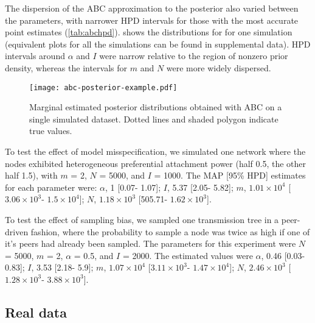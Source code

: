 \documentclass[12pt]{article}\usepackage[]{graphicx}\usepackage[]{color}
\begin{document}
The dispersion of the \gls{ABC} approximation to the posterior also varied
between the parameters, with narrower \gls{HPD} intervals for those with the
most accurate point estimates (\cref{tab:abchpd}).  shows the
distributions for for one simulation (equivalent plots for all the simulations
can be found in supplemental data). \Gls{HPD} intervals around $\alpha$ and $I$
were narrow relative to the region of nonzero prior density, whereas the
intervals for $m$ and $N$ were more widely dispersed.

\begin{figure}[ht]
  \centering
  \texttt{[image: abc-posterior-example.pdf]}
  \caption{Marginal estimated posterior distributions obtained with ABC on a
  single simulated dataset. Dotted lines and shaded polygon indicate true
  values.}
  \label{fig:abcex}
\end{figure}



To test the effect of model misspecification, we simulated one network where
the nodes exhibited heterogeneous preferential attachment power (half 0.5, the
other half 1.5), with $m$ = 2, $N$ = 5000, and $I$ = 1000. The \gls{MAP} [95\%
HPD] estimates for each parameter were: 
$\alpha$, 
  1 [0.07-
                           1.07];
$I$,
  5.37 [2.05-
                       5.82];
$m$,
  \ensuremath{1.01\times 10^{4}} [\ensuremath{3.06\times 10^{3}}-
                              \ensuremath{1.5\times 10^{4}}];
$N$,
  \ensuremath{1.18\times 10^{3}} [505.71-
                       \ensuremath{1.62\times 10^{3}}].



To test the effect of sampling bias, we sampled one transmission tree in a
peer-driven fashion, where the probability to sample a node was twice as high
if one of it's peers had already been sampled. The parameters for this
experiment were $N$ = 5000, $m$ = 2, $\alpha$ = 0.5, and $I$ = 2000. The
estimated values were
$\alpha$, 
  0.46 [0.03-
                           0.83];
$I$,
  3.53 [2.18-
                       5.9];
$m$,
  \ensuremath{1.07\times 10^{4}} [\ensuremath{3.11\times 10^{3}}-
                              \ensuremath{1.47\times 10^{4}}];
$N$,
  \ensuremath{2.46\times 10^{3}} [\ensuremath{1.28\times 10^{3}}-
                       \ensuremath{3.88\times 10^{3}}].

\subsection*{Real data}
\end{document}
